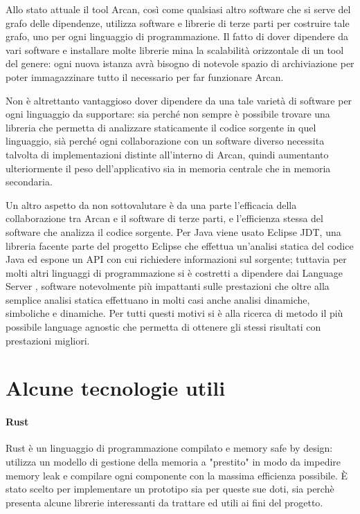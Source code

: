 Allo stato attuale il tool Arcan, cos\`i come qualsiasi altro software che si serve del grafo delle dipendenze, utilizza software e librerie di terze parti per costruire tale grafo, uno per ogni linguaggio di programmazione. Il fatto di dover dipendere da vari software e installare molte librerie mina la scalabilit\`a orizzontale di un tool del genere: ogni nuova istanza avr\`a bisogno di notevole spazio di archiviazione per poter immagazzinare tutto il necessario per far funzionare Arcan.

Non \`e altrettanto vantaggioso dover dipendere da una tale variet\`a di software per ogni linguaggio da supportare: sia perch\'e non sempre \`e possibile trovare una libreria che permetta di analizzare staticamente il codice sorgente in quel linguaggio, si\`a perch\'e ogni collaborazione con un software diverso necessita talvolta di implementazioni distinte all'interno di Arcan, quindi aumentanto ulteriormente il peso dell'applicativo sia in memoria centrale che in memoria secondaria.

Un altro aspetto da non sottovalutare \`e da una parte l'efficacia della collaborazione tra Arcan e il software di terze parti, e l'efficienza stessa del software che analizza il codice sorgente. Per Java viene usato Eclipse JDT, una libreria facente parte del progetto Eclipse che effettua un'analisi statica del codice Java ed espone un API con cui richiedere informazioni sul sorgente; tuttavia per molti altri linguaggi di programmazione si \`e costretti a dipendere dai Language Server \cite{Language Server}, software notevolmente pi\`u impattanti sulle prestazioni che oltre alla semplice analisi statica effettuano in molti casi anche analisi dinamiche, simboliche e dinamiche. Per tutti questi motivi si \`e alla ricerca di metodo il pi\`u possibile language agnostic che permetta di ottenere gli stessi risultati con prestazioni migliori.

\section{Alcune tecnologie utili}

\paragraph{Rust}
Rust \cite{blandy2017programming} \`e un linguaggio di programmazione compilato e memory safe by design: utilizza un modello di gestione della memoria a "prestito" in modo da impedire memory leak e compilare ogni componente con la massima efficienza possibile. \`E stato scelto per implementare un prototipo sia per queste sue doti, sia perch\`e presenta alcune librerie interessanti da trattare ed utili ai fini del progetto.

